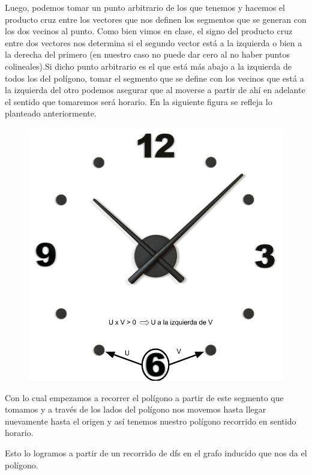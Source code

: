 Luego, podemos tomar un punto arbitrario de los que tenemos y hacemos el producto cruz entre los vectores que nos definen los segmentos que se generan con los dos vecinos al punto. Como bien vimos en clase, el signo del producto cruz entre dos vectores nos determina si el segundo vector está a la izquierda o bien a la derecha del primero (en nuestro caso no puede dar cero al no haber puntos colineales).Si dicho punto arbitrario es el que está más abajo a la izquierda de todos los del polígono, tomar el segmento que se define con los vecinos que está a la izquierda del otro podemos asegurar que al moverse a partir de ahí en adelante el sentido que tomaremos será horario. En la siguiente figura se refleja lo planteado anteriormente.

\begin{figure}[h!]
	\centering
	\includegraphics[scale = 0.25]{img/sentido-horario.png}
\end{figure}

Con lo cual empezamos a recorrer el polígono a partir de este segmento que tomamos y a través de los lados del polígono nos movemos hasta llegar nuevamente hasta el origen y así tenemos nuestro polígono recorrido en sentido horario.\newline    

Esto lo logramos a partir de un recorrido de dfs en el grafo inducido que nos da el polígono.\newline

